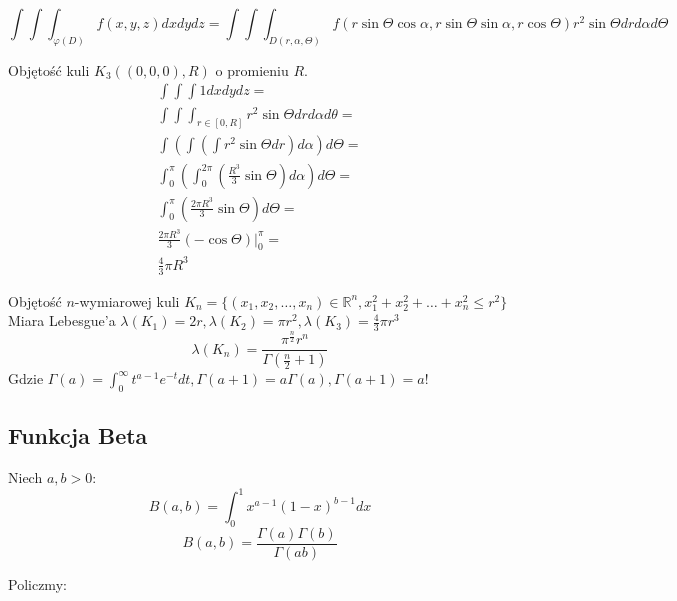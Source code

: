 \documentclass{article}
\theoremstyle{definition}
\theoremstyle{definition}
\theoremstyle{definition}
\theoremstyle{definition}
\theoremstyle{definition}
\theoremstyle{definition}
\theoremstyle{definition}
\begin{document}
\[\int\int\int_{\varphi(D)} f(x,y,z)dxdydz = \int\int\int_{D(r,\alpha,\Theta)} f(r\sin\Theta\cos\alpha, r\sin\Theta\sin\alpha, r\cos\Theta) r^2 \sin\Theta dr d\alpha d\Theta\]

Objętość kuli $K_3((0,0,0),R)$ o promieniu $R$.
\begin{align}
    \int\int\int 1dxdydz =\\
    \int\int\int_{r\in[0,R]} r^2\sin\Theta drd\alpha d\theta =\\
    \int\left(\int\left(\int r^2 \sin\Theta dr\right) d\alpha\right) d\Theta =\\
    \int_{0}^{\pi}\left(\int_{0}^{2\pi} \left(\frac{R^3}{3} \sin\Theta\right) d\alpha\right)d\Theta =\\
    \int_{0}^{\pi}\left(\frac{2\pi R^3}{3} \sin\Theta\right) d\Theta =\\
    \frac{2\pi R^3}{3}(-\cos\Theta)|_{0}^{\pi} =\\
    \frac{4}{3}\pi R^3
\end{align}

Objętość $n$-wymiarowej kuli $K_n=\{(x_1,x_2,\dots,x_n)\in\mathbb{R}^n, x_1^2+x_2^2+\dots+x_n^2 \leq r^2\}$\\
Miara Lebesgue'a $\lambda(K_1)=2r, \lambda(K_2)=\pi r^2, \lambda(K_3)=\frac{4}{3}\pi r^3$
\[\lambda(K_n) = \frac{\pi^{\frac{n}{2}}r^n}{\Gamma(\frac{n}{2}+1)}\]
Gdzie $\Gamma(a)=\int_{0}^{\infty} t^{a-1}e^{-t}dt, \Gamma(a+1)=a\Gamma(a),\Gamma(a+1)=a!$

\subsection{Funkcja Beta}

Niech $a,b>0$:
\[B(a,b)=\int_{0}^{1} x^{a-1} (1-x)^{b-1} dx\]
\[B(a,b)=\frac{\Gamma(a)\Gamma(b)}{\Gamma(ab)}\]

Policzmy:
\end{document}
